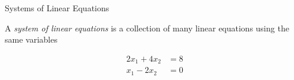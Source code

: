 \documentclass[xcoler=dvipsnames, aspectratio=169]{beamer}
\begin{document}
\iftoggle{showSolutions}{
\begin{frame}{Linear Equation Review}
    \begin{defn}
        Linear Equations:

        A linear equation of $n$ variables $x_1,\dots, x_n$ is an equation that can be written in the form
        \begin{equation*}
            a_1x_1 + a_2x_2 + \dots + a_nx_n = b
        \end{equation*}
        Where
        $b$ and $a_1,\dots,a_n$ are constants
    \end{defn}
    \begin{practice}
        Determine which of the following equations are linear in $x_1,x_2,x_3$.

        \begin{columns}
            \column{.45\textwidth}
            \begin{enumerate}
                \item $x_1 + 4x_2 + x_1x_3 = 3$
                \item \alert{$\pi x_1 - \dfrac{x_2}{e^2} = 4$}
            \end{enumerate}
            \column{.45\textwidth}
            \begin{enumerate}\addtocounter{enumi}{2}
                \item \alert{$\cos{(4)}x_1 + \sin{(2)}x_2 + x_3 = e\pi$}
            \end{enumerate}
        \end{columns}
    \end{practice}
\end{frame}
}
{}
\begin{frame}{Systems of Linear Equations}
    \begin{defn}
        A \textit{system of linear equations} is a collection of many linear equations using the same variables
    \end{defn}
    \begin{ex}
        \begin{align*}
            2x_1 + 4x_2 &= 8 \\
            x_1 - 2x_2 &= 0
        \end{align*}
    \end{ex}
\end{frame}
\end{document}
